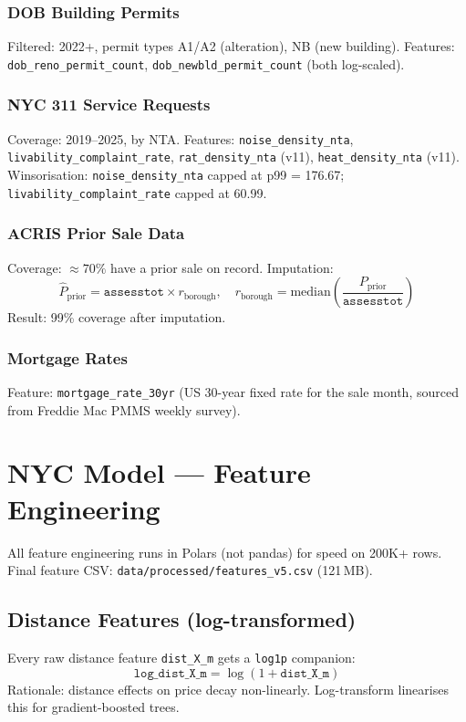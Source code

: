 \documentclass[11pt, a4paper, twoside]{report}
\begin{document}
\subsection*{DOB Building Permits}
Filtered: 2022+, permit types A1/A2 (alteration), NB (new building).
Features: \texttt{dob\_reno\_permit\_count}, \texttt{dob\_newbld\_permit\_count}
(both log-scaled).

\subsection*{NYC 311 Service Requests}
Coverage: 2019--2025, by NTA.
Features: \texttt{noise\_density\_nta}, \texttt{livability\_complaint\_rate},
\texttt{rat\_density\_nta} (v11), \texttt{heat\_density\_nta} (v11).
Winsorisation: \texttt{noise\_density\_nta} capped at p99 = 176.67;
\texttt{livability\_complaint\_rate} capped at 60.99.

\subsection*{ACRIS Prior Sale Data}
Coverage: $\approx 70\%$ have a prior sale on record. Imputation:
\[
  \hat{P}_\text{prior} = \texttt{assesstot} \times r_\text{borough},
  \quad r_\text{borough} = \text{median}\!\left(\frac{P_\text{prior}}{\texttt{assesstot}}\right)
\]
Result: 99\% coverage after imputation.

\subsection*{Mortgage Rates}
Feature: \texttt{mortgage\_rate\_30yr} (US 30-year fixed rate for the sale month,
sourced from Freddie Mac PMMS weekly survey).

\chapter{NYC Model --- Feature Engineering}
\label{ch:nyc_features}

All feature engineering runs in Polars (not pandas) for speed on 200K+ rows.
Final feature CSV: \texttt{data/processed/features\_v5.csv} (121\,MB).

\section{Distance Features (log-transformed)}
Every raw distance feature \texttt{dist\_X\_m} gets a \texttt{log1p} companion:
\[
  \texttt{log\_dist\_X\_m} = \log(1 + \texttt{dist\_X\_m})
\]
Rationale: distance effects on price decay non-linearly. Log-transform
linearises this for gradient-boosted trees.
\end{document}
